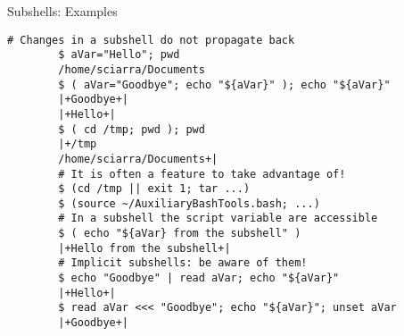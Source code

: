 \begin{frame}[fragile]{Subshells: Examples}
    \begin{lstlisting}[style=MyBash, aboveskip=0mm]
        # Changes in a subshell do not propagate back
        $ aVar="Hello"; pwd
        /home/sciarra/Documents
        $ ( aVar="Goodbye"; echo "${aVar}" ); echo "${aVar}"
        |+Goodbye+|
        |+Hello+|
        $ ( cd /tmp; pwd ); pwd
        |+/tmp
        /home/sciarra/Documents+|
        # It is often a feature to take advantage of!
        $ (cd /tmp || exit 1; tar ...)
        $ (source ~/AuxiliaryBashTools.bash; ...)
        # In a subshell the script variable are accessible
        $ ( echo "${aVar} from the subshell" )
        |+Hello from the subshell+|
        # Implicit subshells: be aware of them!
        $ echo "Goodbye" | read aVar; echo "${aVar}"
        |+Hello+|
        $ read aVar <<< "Goodbye"; echo "${aVar}"; unset aVar
        |+Goodbye+|
    \end{lstlisting}
    \PrepareURLsymbol[PB]
\end{frame}
